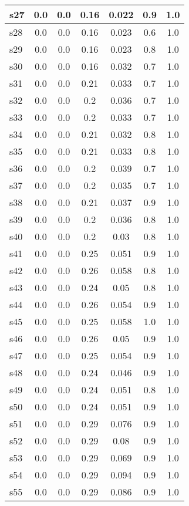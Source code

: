 \documentclass{article}
\begin{document}
\begin{tabular}{|l|c|c|c|c|c|c|}
\hline
s27 &0.0 & 0.0 & 0.16 & 0.022 & 0.9 & 1.0\\
\hline
s28 &0.0 & 0.0 & 0.16 & 0.023 & 0.6 & 1.0\\
\hline
s29 &0.0 & 0.0 & 0.16 & 0.023 & 0.8 & 1.0\\
\hline
s30 &0.0 & 0.0 & 0.16 & 0.032 & 0.7 & 1.0\\
\hline
s31 &0.0 & 0.0 & 0.21 & 0.033 & 0.7 & 1.0\\
\hline
s32 &0.0 & 0.0 & 0.2 & 0.036 & 0.7 & 1.0\\
\hline
s33 &0.0 & 0.0 & 0.2 & 0.033 & 0.7 & 1.0\\
\hline
s34 &0.0 & 0.0 & 0.21 & 0.032 & 0.8 & 1.0\\
\hline
s35 &0.0 & 0.0 & 0.21 & 0.033 & 0.8 & 1.0\\
\hline
s36 &0.0 & 0.0 & 0.2 & 0.039 & 0.7 & 1.0\\
\hline
s37 &0.0 & 0.0 & 0.2 & 0.035 & 0.7 & 1.0\\
\hline
s38 &0.0 & 0.0 & 0.21 & 0.037 & 0.9 & 1.0\\
\hline
s39 &0.0 & 0.0 & 0.2 & 0.036 & 0.8 & 1.0\\
\hline
s40 &0.0 & 0.0 & 0.2 & 0.03 & 0.8 & 1.0\\
\hline
s41 &0.0 & 0.0 & 0.25 & 0.051 & 0.9 & 1.0\\
\hline
s42 &0.0 & 0.0 & 0.26 & 0.058 & 0.8 & 1.0\\
\hline
s43 &0.0 & 0.0 & 0.24 & 0.05 & 0.8 & 1.0\\
\hline
s44 &0.0 & 0.0 & 0.26 & 0.054 & 0.9 & 1.0\\
\hline
s45 &0.0 & 0.0 & 0.25 & 0.058 & 1.0 & 1.0\\
\hline
s46 &0.0 & 0.0 & 0.26 & 0.05 & 0.9 & 1.0\\
\hline
s47 &0.0 & 0.0 & 0.25 & 0.054 & 0.9 & 1.0\\
\hline
s48 &0.0 & 0.0 & 0.24 & 0.046 & 0.9 & 1.0\\
\hline
s49 &0.0 & 0.0 & 0.24 & 0.051 & 0.8 & 1.0\\
\hline
s50 &0.0 & 0.0 & 0.24 & 0.051 & 0.9 & 1.0\\
\hline
s51 &0.0 & 0.0 & 0.29 & 0.076 & 0.9 & 1.0\\
\hline
s52 &0.0 & 0.0 & 0.29 & 0.08 & 0.9 & 1.0\\
\hline
s53 &0.0 & 0.0 & 0.29 & 0.069 & 0.9 & 1.0\\
\hline
s54 &0.0 & 0.0 & 0.29 & 0.094 & 0.9 & 1.0\\
\hline
s55 &0.0 & 0.0 & 0.29 & 0.086 & 0.9 & 1.0\\

\end{tabular}
\end{document}
